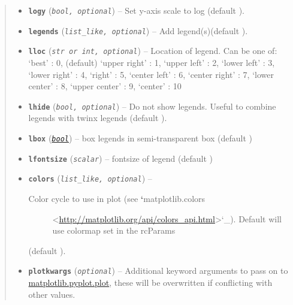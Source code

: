 \documentclass[letterpaper,10pt,english]{sphinxhowto}
\begin{document}
\begin{fulllineitems}
\begin{quote}
\begin{description}
\begin{itemize}
\item {} 
\textbf{\texttt{logy}} (\emph{\texttt{bool, optional}}) -- Set y-axis scale to log (default ).

\item {} 
\textbf{\texttt{legends}} (\emph{\texttt{list\_like, optional}}) -- Add legend(s)(default \code{{[}{]}}).

\item {} 
\textbf{\texttt{lloc}} (\emph{\texttt{str or int, optional}}) -- Location of legend. Can be one of:
`best' : 0, (default)
`upper right'  : 1,
`upper left'   : 2,
`lower left'   : 3,
`lower right'  : 4,
`right'        : 5,
`center left'  : 6,
`center right' : 7,
`lower center' : 8,
`upper center' : 9,
`center'       : 10

\item {} 
\textbf{\texttt{lhide}} (\emph{\texttt{bool, optional}}) -- Do not show legends. Useful to combine legends with twinx legends
(default ).

\item {} 
\textbf{\texttt{lbox}} (\href{https://docs.python.org/library/functions.html\#bool}{\emph{\texttt{bool}}}) -- box legends in semi-transparent box (default )

\item {} 
\textbf{\texttt{lfontsize}} (\emph{\texttt{scalar}}) -- fontsize of legend (default )

\item {} 
\textbf{\texttt{colors}} (\emph{\texttt{list\_like, optional}}) -- \begin{description}
\item[{Color cycle to use in plot (see {\color{red}\bfseries{}{}`}matplotlib.colors}] \leavevmode
\textless{}\href{http://matplotlib.org/api/colors\_api.html}{http://matplotlib.org/api/colors\_api.html}\textgreater{}{}`\_). Default will use
colormap set in the rcParams

\end{description}

(default \code{{[}{]}}).


\item {} 
\textbf{\texttt{plotkwargs}} (\emph{\texttt{optional}}) -- Additional keyword arguments to pass on to
\href{http://matplotlib.org/api/pyplot\_api.html\#matplotlib.pyplot.plot}{matplotlib.pyplot.plot}, these will be overwritten if conflicting
with other values.

\end{itemize}


\end{description}
\end{quote}
\end{fulllineitems}
\end{document}
